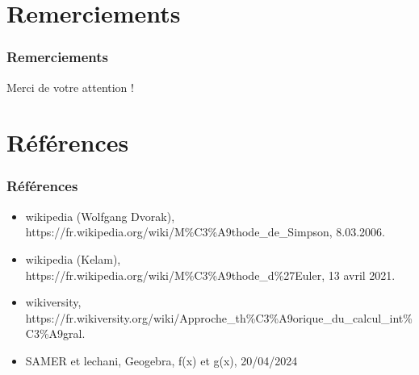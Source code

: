 \documentclass{beamer}
\begin{document}
\section{Remerciements}
\begin{frame}
\frametitle{Remerciements}
\begin{block}{}
\begin{center}
\Huge Merci de votre attention !
\end{center}
\end{block}
\end{frame}


\section{Références}
\begin{frame}
\frametitle{Références}
\begin{itemize}
\\
\item wikipedia (Wolfgang Dvorak), https://fr.wikipedia.org/wiki/M\%C3\%A9thode_de_Simpson, 8.03.2006.

\item wikipedia (Kelam), https://fr.wikipedia.org/wiki/M\%C3\%A9thode_d\%27Euler, 13 avril 2021.

\item wikiversity, https://fr.wikiversity.org/wiki/Approche_th\%C3\%A9orique_du_calcul_int\%C3\%A9gral.

\item SAMER et lechani, Geogebra, f(x) et g(x), 20/04/2024
\end{itemize}
\end{frame}
\end{document}
